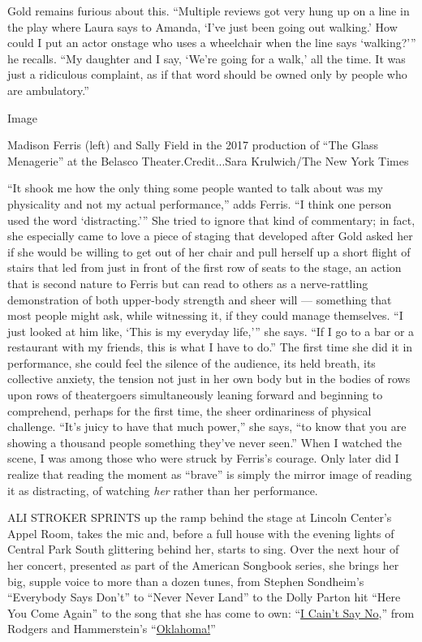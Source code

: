 Gold remains furious about this. ``Multiple reviews got very hung up on
a line in the play where Laura says to Amanda, `I've just been going out
walking.' How could I put an actor onstage who uses a wheelchair when
the line says `walking?''' he recalls. ``My daughter and I say, `We're
going for a walk,' all the time. It was just a ridiculous complaint, as
if that word should be owned only by people who are ambulatory.''

Image

Madison Ferris (left) and Sally Field in the 2017 production of ``The
Glass Menagerie'' at the Belasco Theater.Credit...Sara Krulwich/The New
York Times

``It shook me how the only thing some people wanted to talk about was my
physicality and not my actual performance,'' adds Ferris. ``I think one
person used the word `distracting.''' She tried to ignore that kind of
commentary; in fact, she especially came to love a piece of staging that
developed after Gold asked her if she would be willing to get out of her
chair and pull herself up a short flight of stairs that led from just in
front of the first row of seats to the stage, an action that is second
nature to Ferris but can read to others as a nerve-rattling
demonstration of both upper-body strength and sheer will --- something
that most people might ask, while witnessing it, if they could manage
themselves. ``I just looked at him like, `This is my everyday life,'''
she says. ``If I go to a bar or a restaurant with my friends, this is
what I have to do.'' The first time she did it in performance, she could
feel the silence of the audience, its held breath, its collective
anxiety, the tension not just in her own body but in the bodies of rows
upon rows of theatergoers simultaneously leaning forward and beginning
to comprehend, perhaps for the first time, the sheer ordinariness of
physical challenge. ``It's juicy to have that much power,'' she says,
``to know that you are showing a thousand people something they've never
seen.'' When I watched the scene, I was among those who were struck by
Ferris's courage. Only later did I realize that reading the moment as
``brave'' is simply the mirror image of reading it as distracting, of
watching \emph{her} rather than her performance.

ALI STROKER SPRINTS up the ramp behind the stage at Lincoln Center's
Appel Room, takes the mic and, before a full house with the evening
lights of Central Park South glittering behind her, starts to sing. Over
the next hour of her concert, presented as part of the American Songbook
series, she brings her big, supple voice to more than a dozen tunes,
from Stephen Sondheim's ``Everybody Says Don't'' to ``Never Never Land''
to the Dolly Parton hit ``Here You Come Again'' to the song that she has
come to own: ``\href{https://www.youtube.com/watch?v=FxFS8okUqKk}{I
Cain't Say No},'' from Rodgers and Hammerstein's
``\href{https://www.nytimes3xbfgragh.onion/2019/04/07/theater/oklahoma-review.html}{Oklahoma!}''

